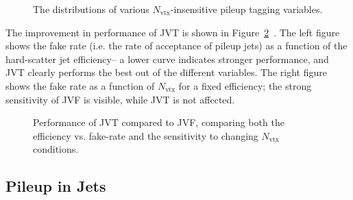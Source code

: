 
\begin{figure}
\centering
{}
\label{fig:jet-reconstruction:jvt}
\caption{The distributions of various $N_\mathrm{vtx}$-insensitive pileup tagging variables.}
\end{figure}


The improvement in performance of JVT is shown in Figure~\ref{fig:jet-reconstruction:jvt_performance}~\cite{ATLAS-JVT}. The left figure shows the fake rate (i.e. the rate of acceptance of pileup jets) as a function of the hard-scatter jet efficiency-- a lower curve indicates stronger performance, and JVT clearly performs the best out of the different variables. The right figure shows the fake rate as a function of $N_\mathrm{vtx}$ for a fixed efficiency; the strong sensitivity of JVF is visible, while JVT is not affected.  


\begin{figure}
\centering
{}
\label{fig:jet-reconstruction:jvt_performance}
\caption{Performance of JVT compared to JVF, comparing both the efficiency vs. fake-rate and the sensitivity to changing $N_\mathrm{vtx}$ conditions.}
\end{figure}


\subsection{Pileup in \LargeR Jets}

